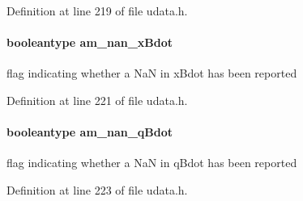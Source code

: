 Definition at line 219 of file udata.\+h.

\hypertarget{struct_user_data_a31f1bd5bfd2c4b1e679b77a96a35e912}{}
\paragraph[{am\+\_\+nan\+\_\+x\+Bdot}]{\setlength{\rightskip}{0pt plus 5cm}booleantype am\+\_\+nan\+\_\+x\+Bdot}\label{struct_user_data_a31f1bd5bfd2c4b1e679b77a96a35e912}
flag indicating whether a Na\+N in x\+Bdot has been reported 

Definition at line 221 of file udata.\+h.

\hypertarget{struct_user_data_ae0ff98d15a201a25bab372fe26bd1523}{}
\paragraph[{am\+\_\+nan\+\_\+q\+Bdot}]{\setlength{\rightskip}{0pt plus 5cm}booleantype am\+\_\+nan\+\_\+q\+Bdot}\label{struct_user_data_ae0ff98d15a201a25bab372fe26bd1523}
flag indicating whether a Na\+N in q\+Bdot has been reported 

Definition at line 223 of file udata.\+h.

